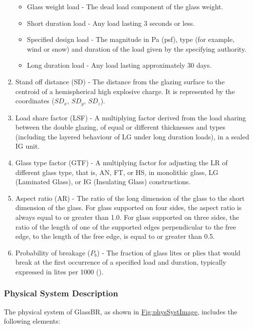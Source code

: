 \documentclass[12pt]{article}
\begin{document}
\begin{enumerate}
\begin{itemize}
\item{Glass weight load - The dead load component of the glass weight.}
\item{Short duration load - Any load lasting 3 seconds or less.}
\item{Specified design load - The magnitude in Pa (psf), type (for example, wind or snow) and duration of the load given by the specifying authority.}
\item{Long duration load - Any load lasting approximately 30 days.}
\end{itemize}
\item{Stand off distance (SD) - The distance from the glazing surface to the centroid of a hemispherical high explosive charge. It is represented by the coordinates (${SD_{x}}$, ${SD_{y}}$, ${SD_{z}}$).}
\item{Load share factor (LSF) - A multiplying factor derived from the load sharing between the double glazing, of equal or different thicknesses and types (including the layered behaviour of LG under long duration loads), in a sealed IG unit.}
\item{Glass type factor (GTF) - A multiplying factor for adjusting the LR of different glass type, that is, AN, FT, or HS, in monolithic glass, LG (Laminated Glass), or IG (Insulating Glass) constructions.}
\item{Aspect ratio (AR) - The ratio of the long dimension of the glass to the short dimension of the glass. For glass supported on four sides, the aspect ratio is always equal to or greater than 1.0. For glass supported on three sides, the ratio of the length of one of the supported edges perpendicular to the free edge, to the length of the free edge, is equal to or greater than 0.5.}
\item{Probability of breakage (${P_{b}}$) - The fraction of glass lites or plies that would break at the first occurrence of a specified load and duration, typically expressed in lites per 1000 (\cite{astm2016}).}
\end{enumerate}
\subsubsection{Physical System Description}
\label{Sec:PhysSyst}
The physical system of GlassBR, as shown in \hyperref[Figure:physSystImage]{Fig:physSystImage}, includes the following elements:
\end{document}
